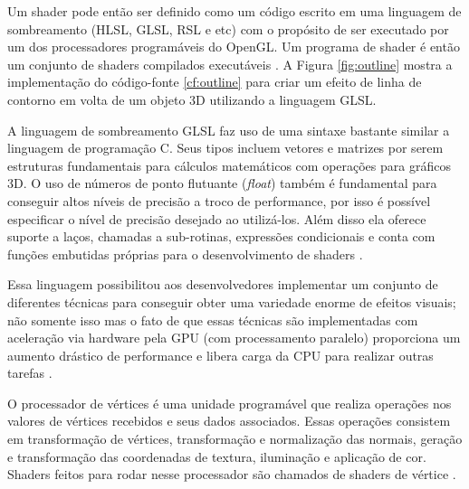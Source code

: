 Um shader pode então ser definido como um código escrito em uma linguagem de sombreamento (HLSL, GLSL, RSL e etc) com o propósito de ser executado por um dos processadores programáveis do OpenGL. Um programa de shader é então um conjunto de shaders compilados executáveis \cite{GLSLBook}. A Figura \ref{fig:outline} mostra a implementação do código-fonte \ref{cf:outline} para criar um efeito de linha de contorno em volta de um objeto 3D utilizando a linguagem GLSL.

\begin{figure}[h!]
	\centering
\end{figure}

A linguagem de sombreamento GLSL faz uso de uma sintaxe bastante similar a linguagem de programação C. Seus tipos incluem vetores e matrizes por serem estruturas fundamentais para cálculos matemáticos com operações para gráficos 3D. O uso de números de ponto flutuante (\textit{float}) também é fundamental para conseguir altos níveis de precisão a troco de performance, por isso é possível especificar o nível de precisão desejado ao utilizá-los. Além disso ela oferece suporte a laços, chamadas a sub-rotinas, expressões condicionais e conta com funções embutidas próprias para o desenvolvimento de shaders \cite{GLSLBook}. 

Essa linguagem possibilitou aos desenvolvedores implementar um conjunto de diferentes técnicas para conseguir obter uma variedade enorme de efeitos visuais; não somente isso mas o fato de que essas técnicas são implementadas com aceleração via hardware pela GPU (com processamento paralelo) proporciona um aumento drástico de performance e libera carga da CPU para realizar outras tarefas \cite{GLSLBook}.

O processador de vértices é uma unidade programável que realiza operações nos valores de vértices recebidos e seus dados associados. Essas operações consistem em transformação de vértices, transformação e normalização das normais, geração e transformação das coordenadas de textura, iluminação e aplicação de cor. Shaders feitos para rodar nesse processador são chamados de shaders de vértice \cite{GLSLBook}. 

